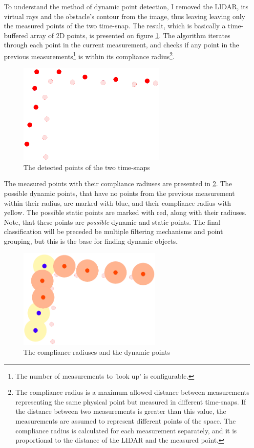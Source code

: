 To understand the method of dynamic point detection, I removed the LIDAR, its virtual rays and the obstacle's contour from the image, thus leaving leaving only the measured points of the two time-snap. The result, which is basically a time-buffered array of 2D points, is presented on figure \ref{obstacle_movement_lidar_only}. The algorithm iterates through each point in the current measurement, and checks if any point in the previous measurements\footnote{The number of measurements to 'look up' is configurable.} is within its compliance radius\footnote{The compliance radius is a maximum allowed distance between measurements representing the same physical point but measured in different time-snaps. If the distance between two measurements is greater than this value, the measurements are assumed to represent different points of the space. The compliance radius is calculated for each measurement separately, and it is proportional to the distance of the LIDAR and the measured point.}.

\begin{figure}[!ht]
    \centering
    \includegraphics[height=50mm]{figures/raw/obstacle_movement_lidar_only.png}
    \caption{The detected points of the two time-snaps}
    \label{obstacle_movement_lidar_only}
\end{figure}

The measured points with their compliance radiuses are presented in \ref{compliance_radiuses}. The possible dynamic points, that have no points from the previous measurement within their radius, are marked with blue, and their compliance radius with yellow. The possible static points are marked with red, along with their radiuses. Note, that these points are \textit{possible} dynamic and static points. The final classification will be preceded be multiple filtering mechanisms and point grouping, but this is the base for finding dynamic objects.

\begin{figure}[!ht]
    \centering
    \includegraphics[height=50mm]{figures/raw/compliance_radiuses.png}
    \caption{The compliance radiuses and the dynamic points}
    \label{compliance_radiuses}
\end{figure}

